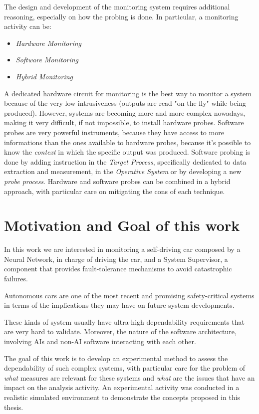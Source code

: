 The design and development of the monitoring system requires additional reasoning, especially on how the probing is done. In particular, a monitoring activity can be:

\begin{itemize}
	\item \textsl{Hardware Monitoring}
	\item \textsl{Software Monitoring}
	\item \textsl{Hybrid Monitoring}
\end{itemize}

A dedicated hardware circuit for monitoring is the best way to monitor a system because of the very low intrusiveness (outputs are read "on the fly" while being produced). However, systems are becoming more and more complex nowadays, making it very difficult, if not impossible, to install hardware probes.
Software probes are very powerful instruments, because they have access to more informations than the ones available to hardware probes, because it's possible to know the \textsl{context} in which the specific output was produced.
Software probing is done by adding instruction in the \textsl{Target Process}, specifically dedicated to data extraction and measurement, in the \textsl{Operative System} or by developing a new \textsl{probe process}.
Hardware and software probes can be combined in a hybrid approach, with particular care on mitigating the cons of each technique.

\section{Motivation and Goal of this work}

In this work we are interested in monitoring a self-driving car composed by a Neural Network, in charge of driving the car, and a System Supervisor, a component that provides fault-tolerance mechanisms to avoid catastrophic failures.

Autonomous cars are one of the most recent and promising safety-critical systems in terms of the implications they may have on future system developments.

These kinds of system usually have ultra-high dependability requirements that are very hard to validate. Moreover, the nature of the software architecture, involving AIs and non-AI software interacting with each other.

The goal of this work is to develop an experimental method to assess the dependability of such complex systems, with particular care for the problem of \textsl{what} measures are relevant for these systems and \textsl{what} are the issues that have an impact on the analysis activity.
An experimental activity was conducted in a realistic simulated environment to demonstrate the concepts proposed in this thesis.

